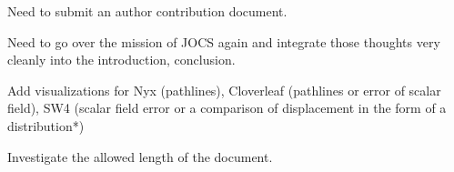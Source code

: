 

Need to submit an author contribution document. 

Need to go over the mission of JOCS again and integrate those thoughts very cleanly into the introduction, conclusion. 

Add visualizations for Nyx (pathlines), Cloverleaf (pathlines or error of scalar field), SW4 (scalar field error or a comparison of displacement in the form of a distribution*)

Investigate the allowed length of the document. 
